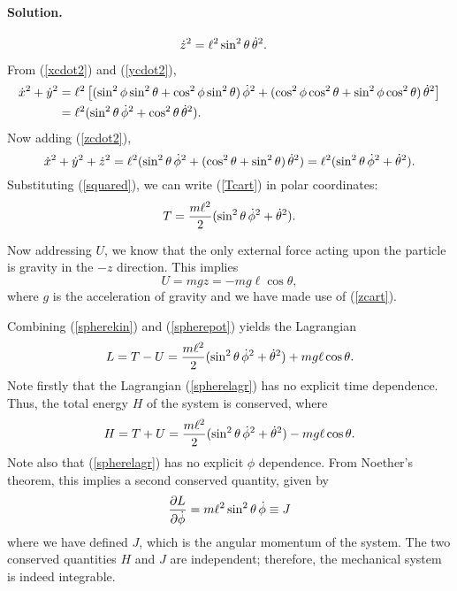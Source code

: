 \documentclass[11pt]{article}
\newcommand{\refeq}[1]{(\ref{#1})}
\newenvironment{solution}
{
    \paragraph{Solution.}
    \ignorespaces
}
{
    \bigskip
}
\begin{document}
\begin{solution}
\begin{align}
	\dot{z}^2 &= \ell^2 \sin^2{\theta} \,\dot{\theta}^2. \label{zcdot2}
	\end{align}
	From \refeq{xcdot2} and \refeq{ycdot2},
	\begin{align}
		\dot{x}^2 + \dot{y}^2 &= \ell^2 \left[ (\sin^2{\phi} \sin^2{\theta} + \cos^2{\phi} \sin^2{\theta}) \,\dot{\phi}^2 + (\cos^2{\phi} \cos^2{\theta} + \sin^2{\phi} \cos^2{\theta}) \,\dot{\theta}^2 \right] \\
		&= \ell^2 (\sin^2{\theta} \,\dot{\phi}^2 + \cos^2{\theta} \,\dot{\theta}^2).
	\end{align}
	Now adding \refeq{zcdot2},
	\begin{equation}
		\dot{x}^2 + \dot{y}^2 + \dot{z}^2 = \ell^2 (\sin^2{\theta} \,\dot{\phi}^2 + (\cos^2{\theta} + \sin^2{\theta}) \,\dot{\theta}^2) = \ell^2 (\sin^2{\theta} \,\dot{\phi}^2 + \dot{\theta}^2). \label{sqaured}
	\end{equation}
	Substituting \refeq{squared}, we can write \refeq{Tcart} in polar coordinates:
	\begin{equation} \label{spherekin}
		T = \frac{m \ell^2}{2} (\sin^2{\theta} \,\dot{\phi}^2 + \dot{\theta}^2).
	\end{equation}
	
	Now addressing $U$, we know that the only external force acting upon the particle is gravity in the $-z$ direction.  This implies
	\begin{equation} \label{spherepot}
		U = m g z = - m g \ell \cos{\theta},
	\end{equation}
	where $g$ is the acceleration of gravity and we have made use of \refeq{zcart}.
	
	Combining \refeq{spherekin} and \refeq{spherepot} yields the Lagrangian
	\begin{equation} \label{spherelagr}
		L = T - U = \frac{m \ell^2}{2} (\sin^2{\theta} \,\dot{\phi}^2 + \dot{\theta}^2) + m g \ell \cos{\theta}.
	\end{equation}
	Note firstly that the Lagrangian \refeq{spherelagr} has no explicit time dependence.  Thus, the total energy $H$ of the system is conserved, where
	\begin{equation} \label{consH}
		H = T + U = \frac{m \ell^2}{2} (\sin^2{\theta} \,\dot{\phi}^2 + \dot{\theta}^2) - m g \ell \cos{\theta}.
	\end{equation}
	Note also that \refeq{spherelagr} has no explicit $\phi$ dependence.  From Noether's theorem, this implies a second conserved quantity, given by
	\begin{equation} \label{consJ}
		\pdv{L}{\dot{\phi}} = m \ell^2 \sin^2{\theta} \,\dot{\phi} \equiv J
	\end{equation}
	where we have defined $J$, which is the angular momentum of the system.  The two conserved quantities $H$ and $J$ are independent; therefore, the mechanical system is indeed integrable.
\end{solution}
\end{document}
